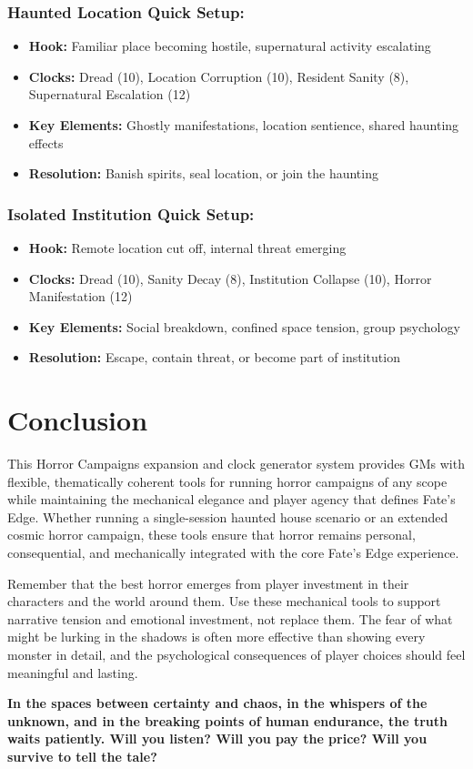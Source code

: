 \documentclass[11pt]{article}
\begin{document}
\subsubsection{Haunted Location Quick Setup:}
\begin{itemize}
\item \textbf{Hook:} Familiar place becoming hostile, supernatural activity escalating
\item \textbf{Clocks:} Dread (10), Location Corruption (10), Resident Sanity (8), Supernatural Escalation (12)
\item \textbf{Key Elements:} Ghostly manifestations, location sentience, shared haunting effects
\item \textbf{Resolution:} Banish spirits, seal location, or join the haunting
\end{itemize}

\subsubsection{Isolated Institution Quick Setup:}
\begin{itemize}
\item \textbf{Hook:} Remote location cut off, internal threat emerging
\item \textbf{Clocks:} Dread (10), Sanity Decay (8), Institution Collapse (10), Horror Manifestation (12)
\item \textbf{Key Elements:} Social breakdown, confined space tension, group psychology
\item \textbf{Resolution:} Escape, contain threat, or become part of institution
\end{itemize}

\section{Conclusion}

This Horror Campaigns expansion and clock generator system provides GMs with flexible, thematically coherent tools for running horror campaigns of any scope while maintaining the mechanical elegance and player agency that defines Fate's Edge. Whether running a single-session haunted house scenario or an extended cosmic horror campaign, these tools ensure that horror remains personal, consequential, and mechanically integrated with the core Fate's Edge experience.

Remember that the best horror emerges from player investment in their characters and the world around them. Use these mechanical tools to support narrative tension and emotional investment, not replace them. The fear of what might be lurking in the shadows is often more effective than showing every monster in detail, and the psychological consequences of player choices should feel meaningful and lasting.

\begin{center}
\textbf{In the spaces between certainty and chaos, in the whispers of the unknown, and in the breaking points of human endurance, the truth waits patiently. Will you listen? Will you pay the price? Will you survive to tell the tale?}
\end{center}
\end{document}
